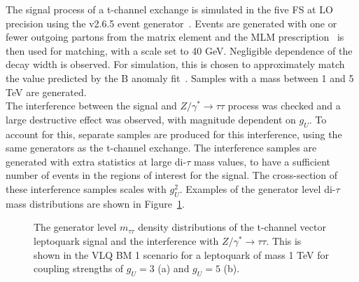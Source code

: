The signal process of a t-channel exchange is simulated in the five \ac{FS} at \ac{LO} precision using the \MGvATNLO v2.6.5 event generator~\cite{Alwall:2011uj}.
Events are generated with one or fewer outgoing partons from the matrix element and the MLM prescription~\cite{Frederix:2012ps} is then used for matching, with a scale set to 40 GeV.
Negligible dependence of the decay width is observed. 
For simulation, this is chosen to approximately match the value predicted by the B anomaly fit~\cite{Cornella:2021sby}.
Samples with a mass between 1 and 5 TeV are generated. \\

The interference between the signal and $Z/\gamma^* \rightarrow \tau\tau$ process was checked and a large destructive effect was observed, with magnitude dependent on $g_{U}$.
To account for this, separate samples are produced for this interference, using the same generators as the t-channel exchange.
The interference samples are generated with extra statistics at large di-$\tau$ mass values, to have a sufficient number of events in the regions of interest for the signal.
The cross-section of these interference samples scales with $g_{U}^2$. 
Examples of the generator level di-$\tau$ mass distributions are shown in Figure~\ref{fig:vlq_signal}. \\

\begin{figure}[t]
\centering
\caption[Plots of the vector leptoquark generator level $m_{\tau\tau}$ distributions, when changing $g_{U}$.]{The generator level $m_{\tau\tau}$ density distributions of the t-channel vector leptoquark signal and the interference with $Z/\gamma^* \rightarrow \tau\tau$. This is shown in the VLQ BM 1 scenario for a leptoquark of mass 1 TeV for coupling strengths of $g_{U}=3$ (a) and $g_{U}=5$ (b).}
\label{fig:vlq_signal}
\end{figure}

